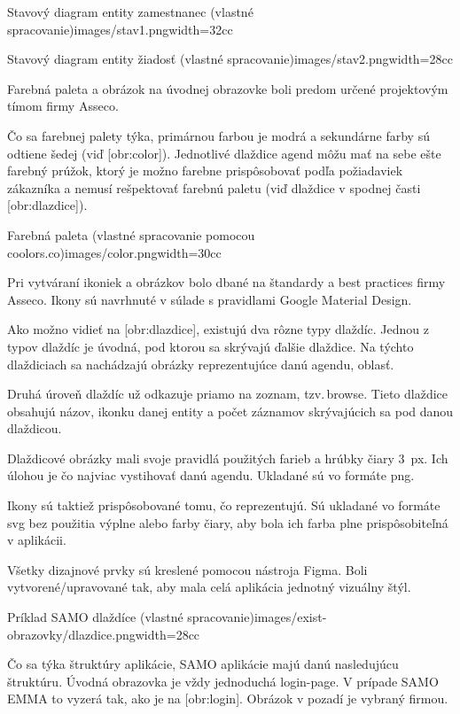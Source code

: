 {Stavový diagram entity zamestnanec (vlastné spracovanie)}{images/stav1.png}{width=32cc} 


{Stavový diagram entity žiadosť (vlastné spracovanie)}{images/stav2.png}{width=28cc} 


\zlom
{}
Farebná paleta a obrázok na úvodnej obrazovke boli predom určené projektovým tímom firmy Asseco.

Čo sa farebnej palety týka, primárnou farbou je modrá a sekundárne farby sú odtiene šedej (viď [obr:color]). Jednotlivé dlaždice agend môžu mať na sebe ešte farebný prúžok, ktorý je možno farebne prispôsobovať podľa požiadaviek zákazníka a nemusí rešpektovať farebnú paletu (viď dlaždice v spodnej časti [obr:dlazdice]).

{Farebná paleta (vlastné spracovanie pomocou coolors.co)}{images/color.png}{width=30cc} 

Pri vytváraní ikoniek a obrázkov bolo dbané na štandardy a best practices firmy Asseco. Ikony sú navrhnuté v súlade s pravidlami Google Material Design. 

Ako možno vidieť na [obr:dlazdice], existujú dva rôzne typy dlaždíc. Jednou z typov dlaždíc je úvodná, pod ktorou sa skrývajú ďalšie dlaždice. Na týchto dlaždiciach sa nachádzajú obrázky reprezentujúce danú agendu, oblasť. 

Druhá úroveň dlaždíc už odkazuje priamo na zoznam, tzv.\,browse. Tieto dlaždice obsahujú názov, ikonku danej entity a počet záznamov skrývajúcich sa pod danou dlaždicou. 

Dlaždicové obrázky mali svoje pravidlá použitých farieb a hrúbky čiary 3~px. Ich úlohou je čo najviac vystihovať danú agendu. Ukladané sú vo formáte png. 

Ikony sú taktiež prispôsobované tomu, čo reprezentujú. Sú ukladané vo formáte svg bez použitia výplne alebo farby čiary, aby bola ich farba plne prispôsobiteľná v aplikácii.

Všetky dizajnové prvky sú kreslené pomocou nástroja Figma. Boli vytvorené/upravované tak, aby mala celá aplikácia jednotný vizuálny štýl. 

{Príklad SAMO dlaždíce (vlastné spracovanie)}{images/exist-obrazovky/dlazdice.png}{width=28cc} 

Čo sa týka štruktúry aplikácie, SAMO aplikácie majú danú nasledujúcu štruktúru.  Úvodná obrazovka je vždy jednoduchá login-page. V prípade SAMO EMMA to vyzerá tak, ako je na [obr:login]. Obrázok v pozadí je vybraný firmou.

